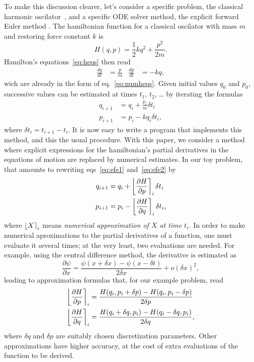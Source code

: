 \documentclass{iopart}
\newcommand{\numap}[1]{\ensuremath{%
    \left\lfloor#1\right\rceil
}}
\begin{document}
To make this discussion clearer, let's consider a specific problem, the
classical harmonic oscilator~\cite{french:71}, and a specific ODE solver method,
the explicit forward Euler method \cite{sir:2010}. The hamiltonian function for
a classical oscilator with mass $m$ and restoring force constant $k$ is 
\begin{equation}
  H(q,p)=\frac{1}{2}kq^2+\frac{p^2}{2m}.
\end{equation}
Hamilton's equations~\eqref{eq:heqs} then read
\begin{align}
  \frac{dq}{dt}&=\frac{p}{m}&
  \frac{dp}{dt}&=-kq,
\end{align}
wich are already in the form of eq.~\eqref{eq:numheqs}. Given initial values
$q_0$ and $p_0,$ successive values can be estimated at times $t_1$, $t_2$, \ldots
by iterating the formulas
\begin{align}
  q_{i+1}&=q_{i}+\frac{p_i}{m}\delta t_i\label{eq:efe1}\\
  p_{i+1}&=p_{i}-kq_i\delta t_i\label{eq:efe2},
\end{align}
where $\delta t_i=t_{i+1}-t_i$. It is now easy to write a  program that
implements this method, and this the usual procedure. With this paper, we
consider a method where explicit expressions for the hamiltonian's partial
derivatives in the equations of motion are replaced by numerical estimates. In
our toy problem, that amounts to rewriting eqs~\eqref{eq:efe1}
and~\eqref{eq:efe2} by
\begin{align*}
  q_{i+1}&=q_{i}+\numap{\frac{\partial H}{\partial p}}_i \delta t_i\\
  p_{i+1}&=p_{i}-\numap{\frac{\partial H}{\partial q}}_i\delta t_i,
\end{align*}
where $\numap{X}_i$ means \emph{numerical approximation of $X$ at time $t_i$.}
In order to make numerical aproximations to the partial derivatives of a
function, one must evaluate it several times; at the very least, two evaluations
are needed. For example, using the central difference method, the derivative is
estimated as
\begin{equation} 
  \frac{\partial\psi}{\partial x} = 
    \frac{\psi(x+\delta x)-\psi(x-\delta t)}{2\delta x}+
  o(\delta x)^2,
\end{equation}
leading to approximation formulas that, for our example problem, read 
\begin{align}
  \numap{\frac{\partial H}{\partial p}}_i &=
  \frac{H(q_i, p_i+\delta p)-H(q_i, p_i-\delta p)}{2\delta p}\\
  \numap{\frac{\partial H}{\partial q}}_i &=
  \frac{H(q_i+\delta q, p_i)-H(q_i-\delta q, p_i)}{2\delta q},
\end{align}
where $\delta q$ and $\delta p$ are suitably chosen discretization parameters.
Other approximations have higher accuracy, at the cost of extra evaluations of
the function to be derived.
\end{document}
